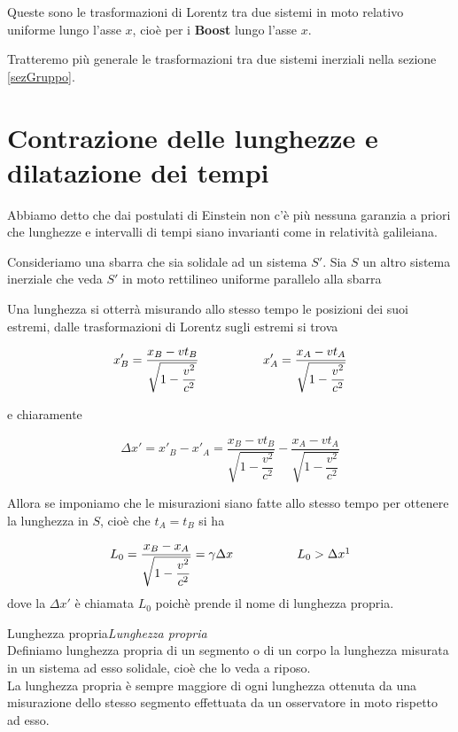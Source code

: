 \documentclass[12pt,a4paper,titlepage, twoside, openright]{book}
\newenvironment{definizione}[1][\empty]{\begin{Definizione}{
\ifx\empty#1\relax\else\mdseries\itshape#1\\\fi
}{}}{\end{Definizione}}
\numberwithin{equation}{chapter}
\begin{document}
Queste sono le trasformazioni di Lorentz tra due sistemi in moto relativo uniforme lungo l'asse $x$, cioè per i \textbf{Boost} lungo l'asse $x$.

Tratteremo più generale le trasformazioni tra due sistemi inerziali nella sezione \ref{sezGruppo}.
\section{Contrazione delle lunghezze e dilatazione dei tempi}
Abbiamo detto che dai postulati di Einstein non c'è più nessuna garanzia a priori che lunghezze e intervalli di tempi siano invarianti come in relatività galileiana. 

Consideriamo una sbarra che sia solidale ad un sistema $S'$. Sia $S$ un altro sistema inerziale che veda $S'$ in moto rettilineo uniforme parallelo alla sbarra

Una lunghezza si otterrà misurando allo stesso tempo le posizioni dei suoi estremi, dalle trasformazioni di Lorentz sugli estremi si trova

\[
x'_B= \dfrac{x_B - vt_B}{\sqrt{1-\dfrac{v^2}{c^2}}} \hspace{0.15\linewidth} x'_A =\dfrac{x_A -vt_A}{\sqrt{1-\dfrac{v^2}{c^2}}}
\]

e chiaramente

\[
\Delta x'=x'_B-x'_A=\dfrac{x_B - vt_B}{\sqrt{1-\dfrac{v^2}{c^2}}}-\dfrac{x_A -vt_A}{\sqrt{1-\dfrac{v^2}{c^2}}}
\]

Allora se imponiamo che le misurazioni siano fatte allo stesso tempo per ottenere la lunghezza in $S$, cioè che $t_A=t_B$ si ha

\begin{equation}
L_0 = \dfrac{x_B - x_A}{\sqrt{1-\dfrac{v^2}{c^2}}} = \gamma \Delta x  \hspace{0.15\linewidth} L_0 > \Delta x \footnotemark{}
\end{equation}
dove la $\Delta x'$ è chiamata $L_0$ poichè prende il nome di lunghezza propria.

\begin{definizione}[Lunghezza propria]
Definiamo lunghezza propria di un segmento o di un corpo la lunghezza misurata in un sistema ad esso solidale, cioè che lo veda a riposo. \\
La lunghezza propria è sempre maggiore di ogni lunghezza ottenuta da una misurazione dello stesso segmento effettuata da un osservatore in moto rispetto ad esso.
\end{definizione}
\end{document}
